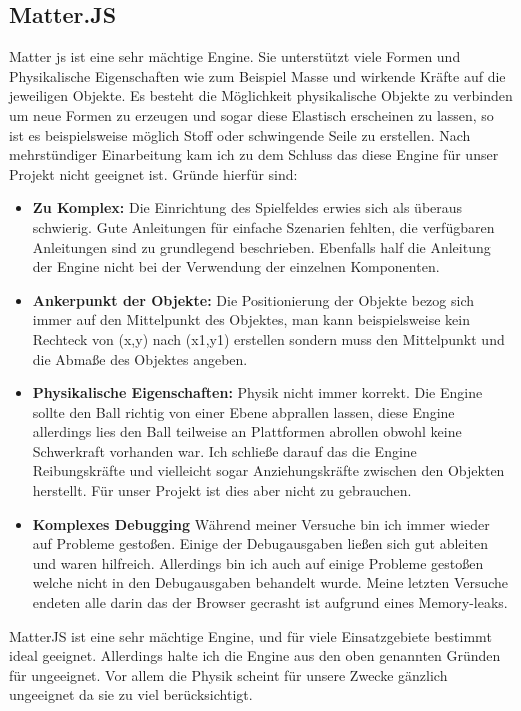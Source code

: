 \subsection{Matter.JS}
Matter js ist eine sehr mächtige Engine. Sie unterstützt viele Formen und Physikalische Eigenschaften wie zum Beispiel Masse und wirkende Kräfte auf die jeweiligen Objekte. 
Es besteht die Möglichkeit physikalische Objekte zu verbinden um neue Formen zu erzeugen und sogar diese Elastisch erscheinen zu lassen, so ist es beispielsweise möglich Stoff oder schwingende Seile zu erstellen.
Nach mehrstündiger Einarbeitung kam ich zu dem Schluss das diese Engine für unser Projekt nicht geeignet ist.
Gründe hierfür sind:
\begin{itemize}
	\item
	      \textbf{Zu Komplex:}
	      Die Einrichtung des Spielfeldes erwies sich als überaus schwierig. Gute Anleitungen für einfache Szenarien fehlten, die verfügbaren Anleitungen sind zu grundlegend beschrieben.
	      Ebenfalls half die Anleitung der Engine nicht bei der Verwendung der einzelnen Komponenten.
	\item
		\textbf{Ankerpunkt der Objekte:}	      
	      Die Positionierung der Objekte bezog sich immer auf den Mittelpunkt des Objektes, man kann beispielsweise kein Rechteck von (x,y) nach (x1,y1) erstellen sondern muss den Mittelpunkt und die Abmaße des Objektes angeben.
	\item
	      \textbf{Physikalische Eigenschaften:}
	      Physik nicht immer korrekt. Die Engine sollte den Ball richtig von einer Ebene abprallen lassen, diese Engine allerdings lies den Ball teilweise an Plattformen abrollen obwohl keine Schwerkraft vorhanden war. Ich schließe darauf das die Engine Reibungskräfte und vielleicht sogar Anziehungskräfte zwischen den Objekten herstellt. Für unser Projekt ist dies aber nicht zu gebrauchen.
	\item
	      \textbf{Komplexes Debugging}
	       Während meiner Versuche bin ich immer wieder auf Probleme gestoßen. Einige der Debugausgaben ließen sich gut ableiten und waren hilfreich. 
	      Allerdings bin ich auch auf einige Probleme gestoßen welche nicht in den Debugausgaben behandelt wurde. Meine letzten Versuche endeten alle darin das der Browser gecrasht ist aufgrund eines Memory-leaks.
\end{itemize}
MatterJS ist eine sehr mächtige Engine, und für viele Einsatzgebiete bestimmt ideal geeignet. Allerdings halte ich die Engine aus den oben genannten Gründen für ungeeignet. Vor allem die Physik scheint für unsere Zwecke gänzlich ungeeignet da sie zu viel berücksichtigt.

